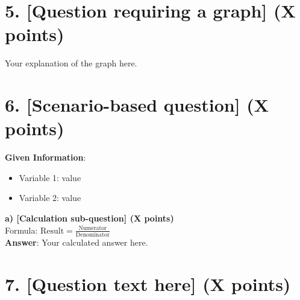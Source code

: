 \documentclass[11pt, letterpaper]{article}
\begin{document}
\section*{5. [Question requiring a graph] (X points)}

\begin{center}
\end{center}

Your explanation of the graph here.

\section*{6. [Scenario-based question] (X points)}

\textbf{Given Information}:
\begin{itemize}[leftmargin=*, noitemsep]
    \item Variable 1: value
    \item Variable 2: value
\end{itemize}

\textbf{a) [Calculation sub-question] (X points)} \\
Formula: $\text{Result} = \frac{\text{Numerator}}{\text{Denominator}}$ \\
\textbf{Answer}: Your calculated answer here.

\section*{7. [Question text here] (X points)}
\end{document}
